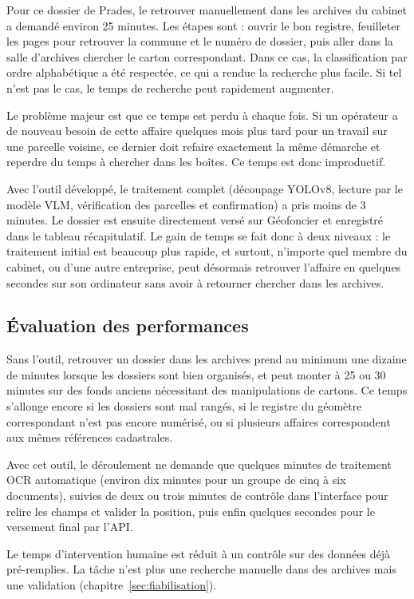 Pour ce dossier de Prades, le retrouver manuellement dans les archives du cabinet a demandé environ 25 minutes. Les étapes sont : ouvrir le bon registre, feuilleter les pages pour retrouver la commune et le numéro de dossier, puis aller dans la salle d'archives chercher le carton correspondant. Dans ce cas, la classification par ordre alphabétique a été respectée, ce qui a rendue la recherche plus facile. Si tel n'est pas le cas, le temps de recherche peut rapidement augmenter.

Le problème majeur est que ce temps est perdu à chaque fois. Si un opérateur a de nouveau besoin de cette affaire quelques mois plus tard pour un travail sur une parcelle voisine, ce dernier doit refaire exactement la même démarche et reperdre du temps à chercher dans les boîtes. Ce temps est donc improductif.

Avec l'outil développé, le traitement complet (découpage YOLOv8, lecture par le modèle VLM, vérification des parcelles et confirmation) a pris moins de 3 minutes. Le dossier est ensuite directement versé sur Géofoncier et enregistré dans le tableau récapitulatif. Le gain de temps se fait donc à deux niveaux : le traitement initial est beaucoup plus rapide, et surtout, n'importe quel membre du cabinet, ou d'une autre entreprise, peut désormais retrouver l'affaire en quelques secondes sur son ordinateur sans avoir à retourner chercher dans les archives. 

\subsection{Évaluation des performances}

Sans l'outil, retrouver un dossier dans les archives prend au minimum une dizaine de minutes lorsque les dossiers sont bien organisés, et peut monter à 25 ou 30 minutes sur des fonds anciens nécessitant des manipulations de cartons. Ce temps s'allonge encore si les dossiers sont mal rangés, si le registre du géomètre correspondant n'est pas encore numérisé, ou si plusieurs affaires correspondent aux mêmes références cadastrales.

Avec cet outil, le déroulement ne demande que quelques minutes de traitement OCR automatique (environ dix minutes pour un groupe de cinq à six documents), suivies de deux ou trois minutes de contrôle dans l'interface pour relire les champs et valider la position, puis enfin quelques secondes pour le versement final par l'API.

Le temps d'intervention humaine est réduit à un contrôle sur des données déjà pré-remplies. La tâche n'est plus une recherche manuelle dans des archives mais une validation (chapitre~\ref{sec:fiabilisation}).

